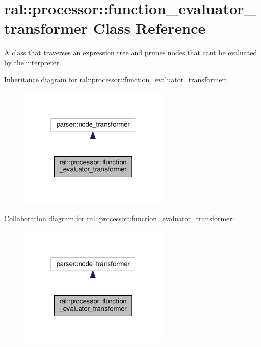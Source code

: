 \hypertarget{classral_1_1processor_1_1function__evaluator__transformer}{}\section{ral\+:\+:processor\+:\+:function\+\_\+evaluator\+\_\+transformer Class Reference}
\label{classral_1_1processor_1_1function__evaluator__transformer}


A class that traverses an expression tree and prunes nodes that can\textquotesingle{}t be evaluated by the interpreter.  




Inheritance diagram for ral\+:\+:processor\+:\+:function\+\_\+evaluator\+\_\+transformer\+:\nopagebreak
\begin{figure}[H]
\begin{center}
\leavevmode
\includegraphics[width=205pt]{classral_1_1processor_1_1function__evaluator__transformer__inherit__graph}
\end{center}
\end{figure}


Collaboration diagram for ral\+:\+:processor\+:\+:function\+\_\+evaluator\+\_\+transformer\+:\nopagebreak
\begin{figure}[H]
\begin{center}
\leavevmode
\includegraphics[width=205pt]{classral_1_1processor_1_1function__evaluator__transformer__coll__graph}
\end{center}
\end{figure}
